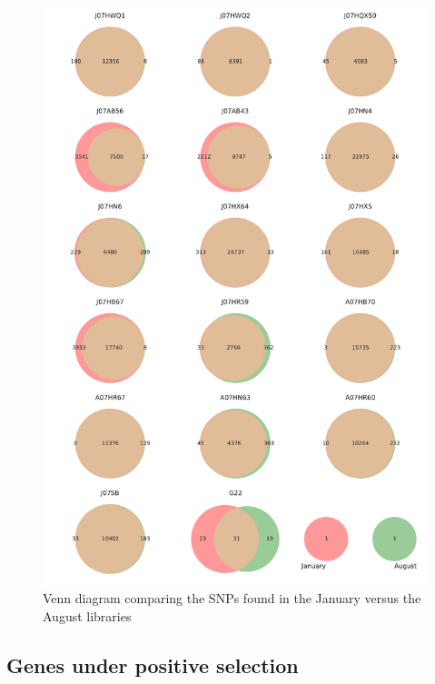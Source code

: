 \begin{figure}[!hbtp]
  \centering
  \includegraphics[width=\textwidth,height=0.9\textheight,keepaspectratio]{Chapter5/Figures/Venn_JanAugSNPs.pdf}
  \caption{Venn diagram comparing the SNPs found in the January versus the August libraries}
  \label{VennBoth}
\end{figure}


\clearpage
\subsection{Genes under positive selection}


